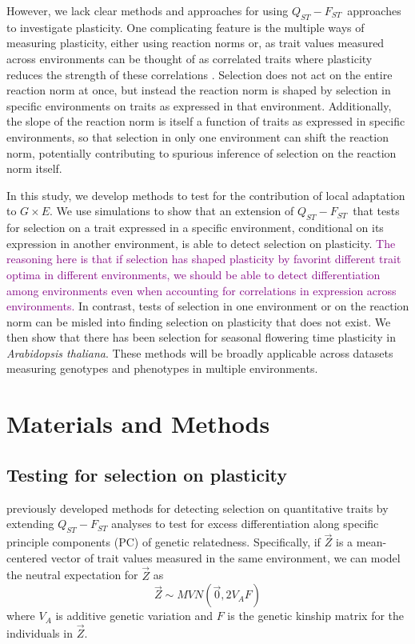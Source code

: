 \documentclass[11pt,letterpaper]{article}
\newcommand{\gxe}{$G \times E$}
\newcommand{\qf}{$Q_{ST}-F_{ST}$}
\begin{document}
However, we lack clear methods and approaches for using \qf\ approaches to investigate plasticity.
One complicating feature is the multiple ways of measuring plasticity, either using reaction norms \citep{scheiner1993genetics, arnold2019analyse} or, as trait values measured across environments can be thought of as correlated traits where plasticity reduces the strength of these correlations \citep{falconer1952problem, via1985genotype}.
Selection does not act on the entire reaction norm at once, but instead the reaction norm is shaped by selection in specific environments on traits as expressed in that environment.
Additionally, the slope of the reaction norm is itself a function of traits as expressed in specific environments, so that selection in only one environment can shift the reaction norm, potentially contributing to spurious inference of selection on the reaction norm itself.

In this study, we develop methods to test for the contribution of local adaptation to \gxe.
We use simulations to show that an extension of \qf\ that tests for selection on a trait expressed in a specific environment, conditional on its expression in another environment, is able to detect selection on plasticity.
\textcolor{purple}{The reasoning here is that if selection has shaped plasticity by favorint different trait optima in different environments, we should be able to detect differentiation among environments even when accounting for correlations in expression across environments.}
In contrast, tests of selection in one environment or on the reaction norm can be misled into finding selection on plasticity that does not exist.
We then show that there has been selection for seasonal flowering time plasticity in \textit{Arabidopsis thaliana}.
These methods will be broadly applicable across datasets measuring genotypes and phenotypes in multiple environments.

\section*{Materials and Methods}

\subsection*{Testing for selection on plasticity}
\cite{Josephs2019} previously developed methods for detecting selection on quantitative traits by extending $Q_{ST}-F_{ST}$ analyses to test for excess differentiation along specific principle components (PC) of genetic relatedness. 
Specifically, if $\vec{Z}$ is a mean-centered vector of trait values measured in the same environment, we can model the neutral expectation for $\vec{Z}$ as 
\begin{equation} \label{eq:mvn}
\vec{Z} \sim MVN (\vec{0}, 2V_{A}F)
\end{equation}
where $V_{A}$ is additive genetic variation and $F$ is the genetic kinship matrix for the individuals in $\vec{Z}$.
\end{document}
